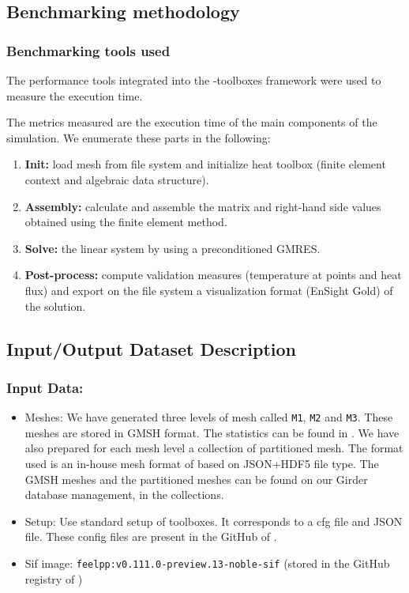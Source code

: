 \subsection{Benchmarking methodology}
\subsubsection{Benchmarking tools used}

The performance tools integrated into the \Feelpp-toolboxes framework were used to measure the execution time.

The metrics measured are the execution time of the main components of the simulation.
We enumerate these parts in the following:
\begin{enumerate}
\item \textbf{Init:} load mesh from file system and initialize heat toolbox (finite element context and algebraic data structure).
\item \textbf{Assembly:} calculate and assemble the matrix and right-hand side values obtained using the finite element method.
\item \textbf{Solve:} the linear system by using a preconditioned GMRES.
\item \textbf{Post-process:} compute validation measures (temperature at points and heat flux) and export on the file system a visualization format (EnSight Gold) of the solution.
\end{enumerate}




\subsection{Input/Output Dataset Description}


\subsubsection{Input Data:}
  \begin{itemize}
  \item Meshes: We have generated three levels of mesh called \texttt{M1}, \texttt{M2}
    and \texttt{M3}. These meshes are stored in GMSH format. The statistics can be found in . We have also prepared for
    each mesh level a collection of partitioned mesh.
    The format used is an in-house mesh format of \Feelpp based on
    JSON+HDF5 file type.
    The GMSH meshes and the partitioned meshes can be found on our Girder
    database management, in the \Feelpp collections.
  \item Setup: Use standard setup of \Feelpp toolboxes. It corresponds to a cfg
    file and JSON file. These config files are present in the GitHub of \Feelpp.
  \item Sif image: \texttt{feelpp:v0.111.0-preview.13-noble-sif}  (stored in the GitHub registry of \Feelpp)
  \end{itemize}

